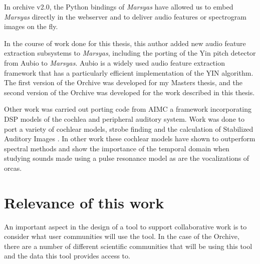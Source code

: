 \documentclass[12pt,oneside]{book}
\begin{document}
In orchive v2.0, the Python bindings of \textit{Marsyas} have allowed us to
embed \textit{Marsyas} directly in the webserver and to deliver audio
features or spectrogram images on the fly.

In the course of work done for this thesis, this author added new
audio feature extraction subsystems to \textit{Marsyas}, including the porting
of the Yin pitch detector from Aubio \cite{brossier2006aubio} to
\textit{Marsyas}.  Aubio is a widely used audio feature extraction framework
that has a particularly efficient implementation of the YIN algorithm.
The first version of the Orchive was developed for my Masters thesis,
and the second version of the Orchive was developed for the work
described in this thesis.

Other work was carried out porting code from AIMC \cite{waltersphd} a
framework incorporating DSP models of the cochlea and peripheral
auditory system.  Work was done to port a variety of cochlear
models\cite{lyon2011hearing}\cite{lyon2011cas}, strobe finding and the
calculation of Stabilized Auditory Images \cite{patterson1992complex}.
In other work \cite{rehn2009sparse} these cochlear models have shown
to outperform \cite{chechik08} spectral methods
\cite{duda1990correlograms} and show the importance of the temporal
domain \cite{slaney1993time} when studying sounds made using a pulse
resonance model \cite{waltersphd} as are the vocalizations of orcas.


%
%
\clearpage
\section{Relevance of this work}

An important aspect in the design of a tool to support collaborative
work is to consider what user communities will use the tool.  In the
case of the Orchive, there are a number of different scientific
communities that will be using this tool and the data this tool
provides access to.  
\end{document}
